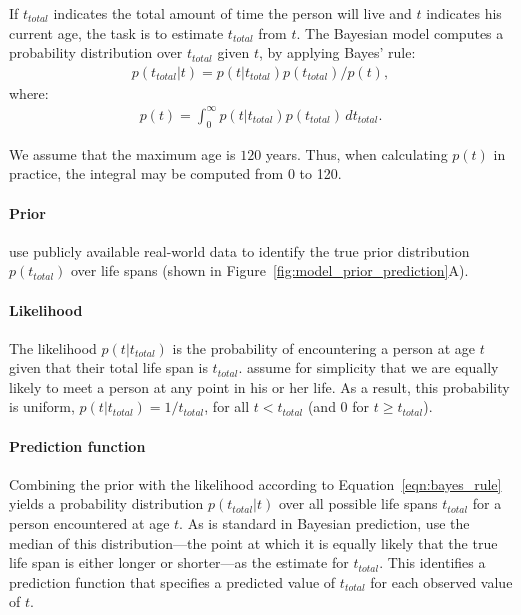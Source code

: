 \documentclass[10pt,letterpaper]{article}
\begin{document}
If $t_{total}$ indicates the total amount of time the person will live and $t$ indicates his current age, the task is to estimate $t_{total}$ from $t$. The Bayesian model computes a probability distribution over $t_{total}$ given $t$, by applying Bayes' rule:
\begin{equation}
\label{eqn:bayes_rule}
\begin{aligned}
p(t_{total} | t) = p(t | t_{total})p(t_{total}) / p(t) ,
\end{aligned}
\end{equation}
where:
\begin{equation}
\label{eqn:p_t}
\begin{aligned}
p(t) = \int_{0}^\infty p(t | t_{total})p(t_{total}) \, dt_{total} .
\end{aligned}
\end{equation}

We assume that the maximum age is $120$ years. 
Thus, when calculating $p(t)$ in practice, the integral may be computed from 0 to 120.

\paragraph{Prior}  use publicly available real-world data to identify the true prior distribution $p(t_{total})$ over life spans (shown in Figure~\ref{fig:model_prior_prediction}A).

\paragraph{Likelihood}

The likelihood $p(t | t_{total})$ is the probability of encountering a person at age $t$ given that their total life span is $t_{total}$.  assume for simplicity that we are equally likely to meet a person at any point in his or her life. As a result, this probability is uniform, $p(t | t_{total}) = 1/t_{total}$, for all $t < t_{total}$ (and 0 for $t \ge t_{total}$).

\paragraph{Prediction function}

Combining the prior with the likelihood according to Equation~\ref{eqn:bayes_rule} yields a probability distribution $p(t_{total} | t)$ over all possible life spans $t_{total}$ for a person encountered at age $t$. As is standard in Bayesian prediction,  use the median of this distribution---the point at which it is equally likely that the true life span is either longer or shorter---as the estimate for $t_{total}$.  This identifies a prediction function that specifies a predicted value of $t_{total}$ for each observed value of $t$. 
\end{document}
